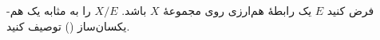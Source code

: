 فرض کنید $E$ یک رابطهٔ هم‌ارزی روی مجموعهٔ $X$ باشد. $X/E$ را به مثابه یک هم-یکسان‌ساز () توصیف کنید.